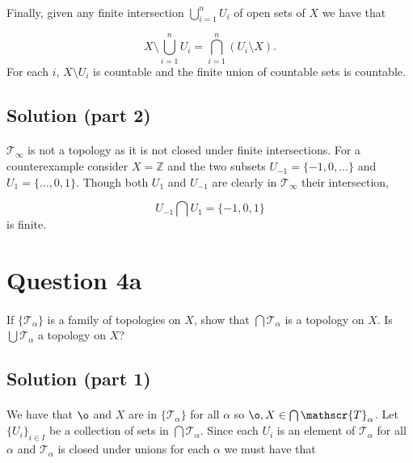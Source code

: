 \documentclass[11pt, oneside]{article}   	%
\begin{document}
\paragraph{}
Finally, given any finite intersection $\bigcup_{i=1}^n U_i$ of open sets of $X$ we have that

\[
X \setminus \bigcup_{i=1}^n U_i =  \bigcap_{i=1}^n (U_i \setminus X).
\]
For each $i$, $X \setminus U_i$ is countable and the finite union of countable sets is countable.

\subsection*{Solution (part 2)}
\paragraph{}

$\mathscr{T}_\infty$ is not a topology as it is not closed under finite intersections. For a counterexample consider $X=\mathbb{Z}$ and the two subsets $U_{-1} = \{-1,0, \dots\}$ and $U_1 = \{\dots, 0,1\}$. Though both $U_1$ and $U_{-1}$ are clearly in $\mathscr{T}_\infty$ their intersection,

\[
U_{-1} \bigcap U_1 = \{-1,0,1\}
\]
is finite.

\section*{Question 4a}
\paragraph{}

If $\{\mathscr{T}_\alpha \}$ is a family of topologies on $X$, show that $\bigcap \mathscr{T}_\alpha$ is a topology on $X$. Is $\bigcup \mathscr{T}_\alpha$ a topology on $X$?

\subsection*{Solution (part 1)}
\paragraph{}

We have that $\o$ and $X$ are in $\{\mathscr{T}_\alpha \}$ for all $\alpha$ so $\o, X \in \bigcap \mathscr{T}_\alpha$. Let $\{U_i\}_{i \in I}$ be a collection of sets in $\bigcap \mathscr{T}_\alpha$. Since each $U_i$ is an element of $\mathscr{T}_\alpha$ for all $\alpha$ and $\mathscr{T}_\alpha$ is closed under unions for each $\alpha$ we must have that
\end{document}
